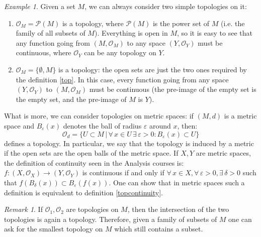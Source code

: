 \documentclass[a4paper,11pt,titlepage, article, oneside]{memoir}
\numberwithin{equation}{section}
\theoremstyle{definition}
\theoremstyle{remark}
\newtheorem{remark}[theorem]{Remark}
\newtheorem{example}[theorem]{Example}
\begin{document}
\begin{tcolorbox}\begin{example} \label{topexamples}
Given a set $M$, we can always consider two simple topologies on it:
\begin{enumerate}
	\item $\mathcal{O}_M =  \mathcal{P}(M)$ is a topology, where $\mathcal{P}(M)$ is the power set of $M$ (i.e. the family of all subsets of $M$). Everything is open in $M$, so it is easy to see that any function going from $(M, \mathcal{O}_M)$ to any space $(Y, \mathcal{O}_Y)$ must be continuous, where $\mathcal{O}_Y$ can be any topology on $Y$.
	\item $\mathcal{O}_M=\{\emptyset, M\}$ is a topology: the open sets are just the two ones required by the definition \ref{top}. In this case, every function going from any space $(Y, \mathcal{O}_Y)$ to $(M, \mathcal{O}_M)$ must be continuous (the pre-image of the empty set is the empty set, and the pre-image of $M$ is $Y$).
\end{enumerate}
What is more, we can consider topologies on metric spaces: if $(M, d)$ is a metric space and $B_{\varepsilon}(x)$ denotes the ball of radius $\varepsilon$ around $x$, then:
$$\mathcal{O}_d = \{U \subset M \, | \, \forall\, x \in U \, \exists\, \varepsilon > 0 \colon B_{\varepsilon}(x) \subset U \}$$
defines a topology. In particular, we say that the topology is induced by a metric if the open sets are the open balls of the metric space. If $X, Y$ are metric spaces, the definition of continuity seen in the Analysis courses is: $f \colon (X, \mathcal{O}_X) \rightarrow (Y, \mathcal{O}_Y)$ is continuous if and only if $\forall \, x \in X, \forall \, \varepsilon > 0, \exists \, \delta > 0$ such that $f\left(B_{\delta}(x)\right) \subset B_{\varepsilon}\left(f(x)\right)$. One can show that in metric spaces such a definition is equivalent to definition \ref{topcontinuity}.
\end{example}\end{tcolorbox}

\begin{remarkbox}\begin{remark}
If $\mathcal{O}_1, \mathcal{O}_2$ are topologies on $M$, then the intersection of the two topologies is again a topology. Therefore, given a family of subsets of $M$ one can ask for the smallest topology on $M$ which still contains a subset.
\end{remark}\end{remarkbox}
\end{document}
